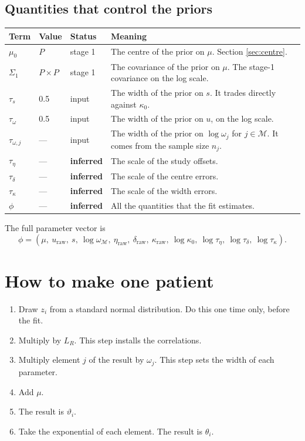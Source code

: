 \documentclass[11pt]{article}
\newcommand{\Mset}{\mathcal{M}}
\newcommand{\INF}{\textcolor{accent}{\textbf{inferred}}}
\newcommand{\FIX}{\textcolor{softgray}{input}}
\newcommand{\STG}{\textcolor{softgray}{stage 1}}
\begin{document}
\subsection*{Quantities that control the priors}
\begin{center}\small
\begin{tabularx}{\textwidth}{@{}lllX@{}}
\toprule
Term & Value & Status & Meaning \\
\midrule
$\mu_0$ & $P$ & \STG & The centre of the prior on $\mu$. Section \ref{sec:centre}. \\
$\Sigma_1$ & $P\times P$ & \STG & The covariance of the prior on $\mu$. The stage-1 covariance on the log scale. \\
$\tau_s$ & 0.5 & \FIX & The width of the prior on $s$. It trades directly against $\kappa_0$. \\
$\tau_\omega$ & 0.5 & \FIX & The width of the prior on $u$, on the log scale. \\
$\tau_{\omega,j}$ & --- & \FIX & The width of the prior on $\log\omega_j$ for $j\in\Mset$. It comes from the sample size $n_j$. \\
$\tau_\eta$ & --- & \INF & The scale of the study offsets. \\
$\tau_\delta$ & --- & \INF & The scale of the centre errors. \\
$\tau_\kappa$ & --- & \INF & The scale of the width errors. \\
$\phi$ & --- & \INF & All the quantities that the fit estimates. \\
\bottomrule
\end{tabularx}
\end{center}

\noindent
The full parameter vector is
\begin{equation*}
\phi=(\mu,\ u_{\text{raw}},\ s,\ \log\omega_\Mset,\
\eta_{\text{raw}},\ \delta_{\text{raw}},\ \kappa_{\text{raw}},\ \log\kappa_0,\
\log\tau_\eta,\ \log\tau_\delta,\ \log\tau_\kappa).
\end{equation*}

\section{How to make one patient}
\label{sec:patient}

\begin{enumerate}
\item Draw $z_i$ from a standard normal distribution. Do this one time only,
      before the fit.
\item Multiply by $L_R$. This step installs the correlations.
\item Multiply element $j$ of the result by $\omega_j$. This step sets the width
      of each parameter.
\item Add $\mu$.
\item The result is $\vartheta_i$.
\item Take the exponential of each element. The result is $\theta_i$.
\end{enumerate}
\end{document}
